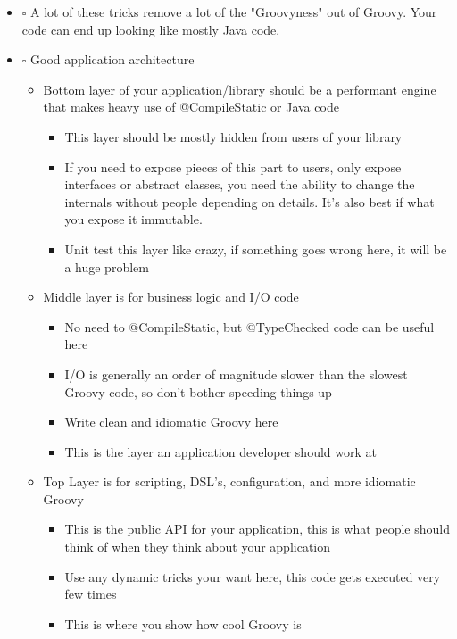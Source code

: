 \documentclass[11pt]{article}
\begin{document}
\begin{itemize}
\item $\square$ A lot of these tricks remove a lot of the "Groovyness" out of Groovy. Your code can end up looking like mostly Java code.

\item $\square$ Good application architecture

\begin{itemize}
\item Bottom layer of your application/library should be a performant engine that makes heavy use of @CompileStatic or Java code

\begin{itemize}
\item This layer should be mostly hidden from users of your library

\item If you need to expose pieces of this part to users, only expose interfaces or abstract classes, you need the ability to change the internals without people depending on details. It's also best if what you expose it immutable.

\item Unit test this layer like crazy, if something goes wrong here, it will be a huge problem
\end{itemize}

\item Middle layer is for business logic and I/O code

\begin{itemize}
\item No need to @CompileStatic, but @TypeChecked code can be useful here

\item I/O is generally an order of magnitude slower than the slowest Groovy code, so don't bother speeding things up

\item Write clean and idiomatic Groovy here

\item This is the layer an application developer should work at
\end{itemize}

\item Top Layer is for scripting, DSL's, configuration, and more idiomatic Groovy

\begin{itemize}
\item This is the public API for your application, this is what people should think of when they think about your application

\item Use any dynamic tricks your want here, this code gets executed very few times

\item This is where you show how cool Groovy is
\end{itemize}
\end{itemize}
\end{itemize}
\end{document}
